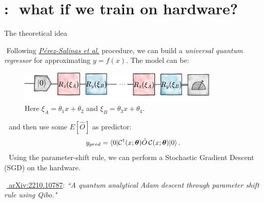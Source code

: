 \documentclass[9pt, xcolor={svgnames}, hyperref={colorlinks, linkcolor=black, citecolor=amethyst, urlcolor=amethyst}]{beamer}
\begin{document}
\section{\faHandPointerO:\,\, what if we train on hardware?}



\begin{frame}{The theoretical idea}
\small

\faArrowCircleRight\,\,Following \href{https://arxiv.org/abs/1907.02085}{\textit{Pérez-Salinas et al.}} 
procedure, we can build a \textit{universal quantum regressor}
for approximating $y=f(x)$. The model can be:
\pause
    \begin{figure}  
    \includegraphics[width=0.85\textwidth]{figures/qpdf.png}
    \caption{Here $\xi_A= \theta_1x+\theta_2$ and $\xi_B = \theta_3x + \theta_4$.}
    \end{figure}
\pause
\faArrowCircleRight\,\, and then use some $E[\hat{O}]$ as predictor:
\begin{equation}
y_{pred} = \braket{0 | \mathcal{C}^{\dagger} (x; \bm{\theta}) \hat{O} \,
\mathcal{C} (x; \bm{\theta}) | 0}.
\end{equation}
\pause
\faArrowCircleRight\,\, Using the parameter-shift rule, we can perform a Stochastic
Gradient Descent (SGD) on the hardware.
\pause

\vfill
\footnotesize
\faBook\,\,\href{https://arxiv.org/abs/2210.10787}{	arXiv:2210.10787}: \textit{``A quantum analytical Adam descent through parameter shift rule using Qibo."}

\end{frame}
\end{document}
